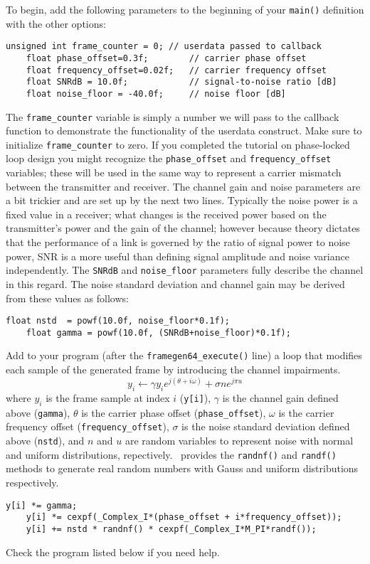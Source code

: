 To begin, add the following parameters to the beginning of your
{\tt main()} definition with the other options:
%
\begin{Verbatim}[fontsize=\small]
    unsigned int frame_counter = 0; // userdata passed to callback
    float phase_offset=0.3f;        // carrier phase offset
    float frequency_offset=0.02f;   // carrier frequency offset
    float SNRdB = 10.0f;            // signal-to-noise ratio [dB]
    float noise_floor = -40.0f;     // noise floor [dB]
\end{Verbatim}
%
The {\tt frame\_counter} variable is simply a number we will pass to the
callback function to demonstrate the functionality of the userdata
construct.
Make sure to initialize {\tt frame\_counter} to zero.
%
If you completed the tutorial on phase-locked loop design you might
recognize the {\tt phase\_offset} and {\tt frequency\_offset} variables;
these will be used in the same way to represent a carrier mismatch
between the transmitter and receiver.
%
The channel gain and noise parameters are a bit trickier and are set up
by the next two lines.
Typically the noise power is a fixed value in a receiver;
what changes is the received power based on the transmitter's power and
the gain of the channel;
however because theory dictates that the performance of a link is
governed by the ratio of signal power to noise power,
SNR is a more useful than defining signal amplitude and noise variance
independently.
The {\tt SNRdB} and {\tt noise\_floor} parameters fully describe the
channel in this regard.
The noise standard deviation and channel gain may be derived from these
values as follows:
%
\begin{Verbatim}[fontsize=\small]
    float nstd  = powf(10.0f, noise_floor*0.1f);
    float gamma = powf(10.0f, (SNRdB+noise_floor)*0.1f);
\end{Verbatim}
%
Add to your program
(after the {\tt framegen64\_execute()} line)
a loop that modifies each sample of the generated frame by introducing
the channel impairments.
%
\[
    y_i \leftarrow \gamma y_i e^{j(\theta + i\omega)} + \sigma n e^{j \pi u}
\]
%
where
$y_i$ is the frame sample at index $i$ ({\tt y[i]}),
$\gamma$ is the channel gain defined above ({\tt gamma}),
$\theta$ is the carrier phase offset ({\tt phase\_offset}),
$\omega$ is the carrier frequency offset ({\tt frequency\_offset}),
$\sigma$ is the noise standard deviation defined above ({\tt nstd}), and
$n$ and $u$ are random variables to represent noise with
normal and uniform distributions, repectively.
\liquid\ provides the {\tt randnf()} and {\tt randf()} methods to
generate real random numbers with Gauss and uniform distributions
respectively.
%
\begin{Verbatim}[fontsize=\small]
    y[i] *= gamma;
    y[i] *= cexpf(_Complex_I*(phase_offset + i*frequency_offset));
    y[i] += nstd * randnf() * cexpf(_Complex_I*M_PI*randf());
\end{Verbatim}
%
Check the program listed below if you need help.

